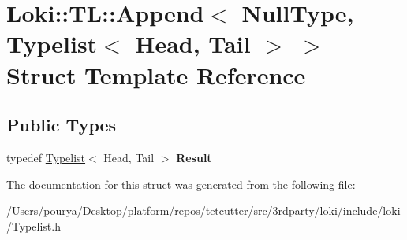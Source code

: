\hypertarget{structLoki_1_1TL_1_1Append_3_01NullType_00_01Typelist_3_01Head_00_01Tail_01_4_01_4}{}\section{Loki\+:\+:T\+L\+:\+:Append$<$ Null\+Type, Typelist$<$ Head, Tail $>$ $>$ Struct Template Reference}
\label{structLoki_1_1TL_1_1Append_3_01NullType_00_01Typelist_3_01Head_00_01Tail_01_4_01_4}
\subsection*{Public Types}
\begin{DoxyCompactItemize}
\item 
\hypertarget{structLoki_1_1TL_1_1Append_3_01NullType_00_01Typelist_3_01Head_00_01Tail_01_4_01_4_afceafeaeef0a3a1967c2147b015cd7b4}{}typedef \hyperlink{structLoki_1_1Typelist}{Typelist}$<$ Head, Tail $>$ {\bfseries Result}\label{structLoki_1_1TL_1_1Append_3_01NullType_00_01Typelist_3_01Head_00_01Tail_01_4_01_4_afceafeaeef0a3a1967c2147b015cd7b4}

\end{DoxyCompactItemize}


The documentation for this struct was generated from the following file\+:\begin{DoxyCompactItemize}
\item 
/\+Users/pourya/\+Desktop/platform/repos/tetcutter/src/3rdparty/loki/include/loki/Typelist.\+h\end{DoxyCompactItemize}
